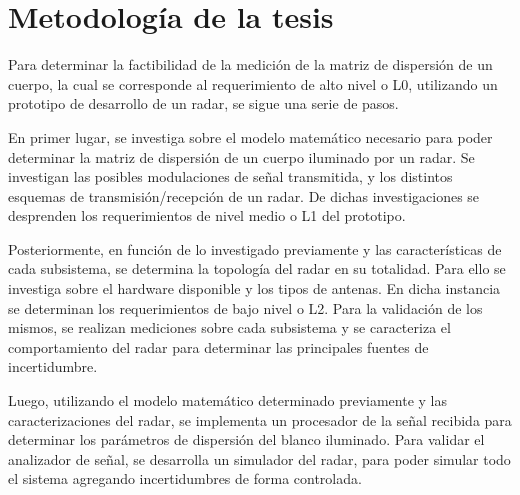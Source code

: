 \section{Metodología de la tesis} \label{sc:methodology}

Para determinar la factibilidad de la medición de la matriz de dispersión de un cuerpo, la cual se corresponde al requerimiento de alto nivel o L0, utilizando un prototipo de desarrollo de un radar, se sigue una serie de pasos. 


En primer lugar, se investiga sobre el modelo matemático necesario para poder determinar la matriz de dispersión de un cuerpo iluminado por un radar. Se investigan las posibles modulaciones de señal transmitida, y los distintos esquemas de transmisión/recepción de un radar. De dichas investigaciones se desprenden los requerimientos de nivel medio o L1 del prototipo.


Posteriormente, en función de lo investigado previamente y las características de cada subsistema, se determina la topología del radar en su totalidad. Para ello se investiga sobre el hardware disponible y los tipos de antenas. En dicha instancia se determinan los requerimientos de bajo nivel o L2. Para la validación de los mismos, se realizan mediciones sobre cada subsistema y se caracteriza el comportamiento del radar para determinar las principales fuentes de incertidumbre.

Luego, utilizando el modelo matemático determinado previamente y las caracterizaciones del radar, se implementa un procesador de la señal recibida para determinar los parámetros de dispersión del blanco iluminado. Para validar el analizador de señal, se desarrolla un simulador del radar, para poder simular todo el sistema agregando incertidumbres de forma controlada.

